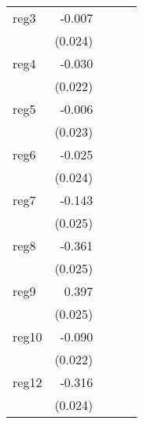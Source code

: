 {\begin{longtable}{l*{4}{D{.}{.}{-1}}}
\addlinespace
reg3        &      -0.007         &                     &                     &                     \\
            &     (0.024)         &                     &                     &                     \\
\addlinespace
reg4        &      -0.030         &                     &                     &                     \\
            &     (0.022)         &                     &                     &                     \\
\addlinespace
reg5        &      -0.006         &                     &                     &                     \\
            &     (0.023)         &                     &                     &                     \\
\addlinespace
reg6        &      -0.025         &                     &                     &                     \\
            &     (0.024)         &                     &                     &                     \\
\addlinespace
reg7        &      -0.143\sym{***}&                     &                     &                     \\
            &     (0.025)         &                     &                     &                     \\
\addlinespace
reg8        &      -0.361\sym{***}&                     &                     &                     \\
            &     (0.025)         &                     &                     &                     \\
\addlinespace
reg9        &       0.397\sym{***}&                     &                     &                     \\
            &     (0.025)         &                     &                     &                     \\
\addlinespace
reg10       &      -0.090\sym{***}&                     &                     &                     \\
            &     (0.022)         &                     &                     &                     \\
\addlinespace
reg12       &      -0.316\sym{***}&                     &                     &                     \\
            &     (0.024)         &                     &                     &                     \\

\end{longtable}}

